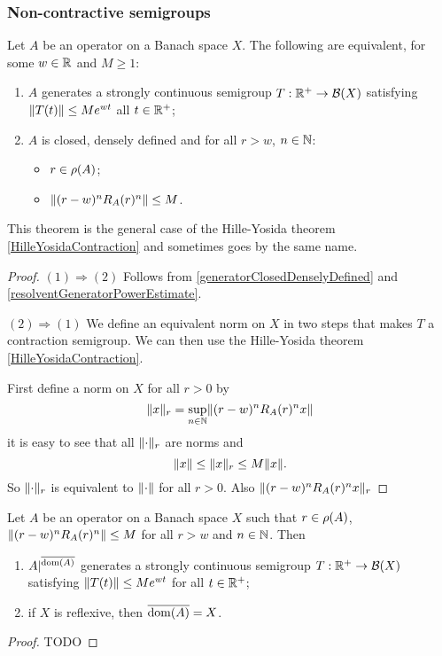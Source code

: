 \subsubsection{Non-contractive semigroups}
\begin{theorem}
Let $A$ be an operator on a Banach space $X$. The following are equivalent, for some $w\in \mathbb{R}$ and $M\geq 1$:
\begin{enumerate}
\item $A$ generates a strongly continuous semigroup $T: \mathbb{R}^+\to \operatorname{\mathcal{B}}(X)$ satisfying $\lVert T(t)\rVert\leq Me^{wt}$ all $t\in\mathbb{R}^+$;
\item $A$ is closed, densely defined and for all $r>w$, $n\in \mathbb{N}$:
\begin{itemize}
\item $r\in \rho(A)$;
\item $\lVert(r-w)^nR_A(r)^n\rVert \leq M$.
\end{itemize}
\end{enumerate}
\end{theorem}
This theorem is the general case of the Hille-Yosida theorem \ref{HilleYosidaContraction} and sometimes goes by the same name.
\begin{proof}
$(1)\Rightarrow (2)$ Follows from \ref{generatorClosedDenselyDefined} and \ref{resolventGeneratorPowerEstimate}.

$(2) \Rightarrow (1)$ We define an equivalent norm on $X$ in two steps that makes $T$ a contraction semigroup. We can then use the Hille-Yosida theorem \ref{HilleYosidaContraction}.

First define a norm on $X$ for all $r>0$ by
\[ \lVert x\rVert_{r} = \sup_{n\in\mathbb{N}}\lVert(r-w)^nR_A(r)^nx\rVert \]
it is easy to see that all $\lVert\cdot\rVert_{r}$ are norms and
\[ \lVert x\rVert \leq \lVert x\rVert_r \leq M\lVert x\rVert. \]
So $\lVert\cdot\rVert_{r}$ is equivalent to $\lVert\cdot\rVert$ for all $r>0$. Also $\lVert(r-w)^nR_A(r)^nx\rVert_r$
\end{proof}
\begin{corollary}
Let $A$ be an operator on a Banach space $X$ such that $r\in \rho(A)$, $\lVert(r-w)^nR_A(r)^n\rVert \leq M$ for all $r>w$ and $n\in \mathbb{N}$. Then
\begin{enumerate}
\item $A|^{\overline{\operatorname{dom}(A)}}$ generates a strongly continuous semigroup $T: \mathbb{R}^+\to \operatorname{\mathcal{B}}(X)$ satisfying $\lVert T(t)\rVert\leq Me^{wt}$ for all $t\in\mathbb{R}^+$;
\item if $X$ is reflexive, then $\overline{\operatorname{dom}(A)} = X$.
\end{enumerate}
\end{corollary}
\begin{proof}
TODO
\end{proof}

